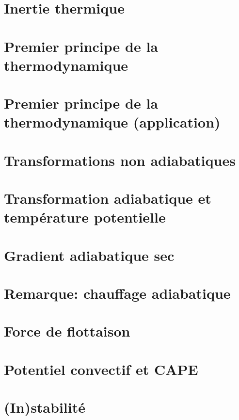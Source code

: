\documentclass[a4paper,DIV16,10pt]{scrartcl}
\begin{document}
\section{Inertie thermique} 


\newpage \section{Premier principe de la thermodynamique} 

\newpage \section{Premier principe de la thermodynamique (application)} 
\section{Transformations non adiabatiques} 

\newpage \section{Transformation adiabatique et température potentielle} 
\section{Gradient adiabatique sec} 

\newpage \section{Remarque: chauffage adiabatique} 
\section{Force de flottaison} 

\section{Potentiel convectif et CAPE} 

\newpage \section{(In)stabilité} 
\end{document}
